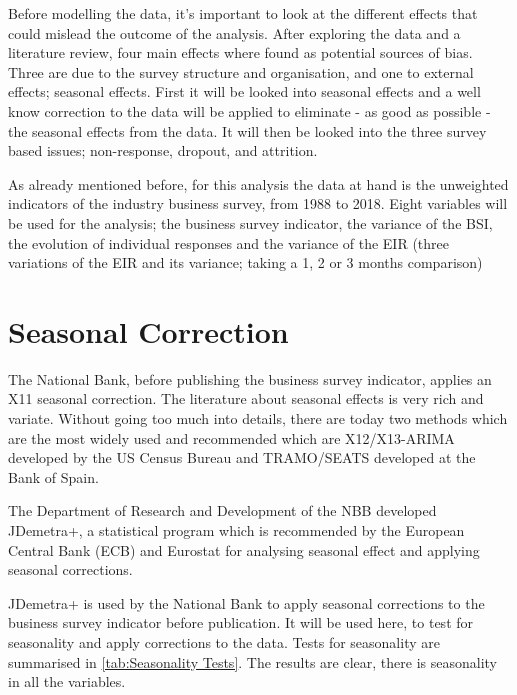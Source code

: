 \documentclass[12pt,a4paper,oneside]{book}
\begin{document}
Before modelling the data, it's important to look at the different effects that could mislead the outcome of the analysis. After exploring the data and a literature review, four main effects where found as potential sources of bias. Three are due to the survey structure and organisation, and one to external effects; seasonal effects. First it will be looked into seasonal effects and a well know correction to the data will be applied to eliminate - as good as possible - the seasonal effects from the data.
It will then be looked into the three survey based issues; non-response, dropout, and attrition.

As already mentioned before, for this analysis the data at hand is the unweighted indicators of the industry business survey, from 1988 to 2018.
Eight variables will be used for the analysis; the business survey indicator, the variance of the BSI, the evolution of individual responses and the variance of the EIR (three variations of the EIR and its variance; taking a 1, 2 or 3 months comparison) 

\section{Seasonal Correction}
\label{sec:seasonal correction}

The National Bank, before publishing the business survey indicator, applies an X11 seasonal correction.
The literature about seasonal effects is very rich and variate. Without going too much into details, there are today two methods which are the most widely used and recommended which are X12/X13-ARIMA developed by the US Census Bureau and TRAMO/SEATS developed at the Bank of Spain. 

The Department of Research and Development of the NBB developed JDemetra+, a statistical program which is recommended by the European Central Bank (ECB) and Eurostat for analysing seasonal effect and applying seasonal corrections. 

JDemetra+ is used by the National Bank to apply seasonal corrections to the business survey indicator before publication. It will be used here, to test for seasonality and apply corrections to the data.
Tests for seasonality are summarised in \autoref{tab:Seasonality Tests}. The results are clear, there is seasonality in all the variables.
\end{document}
